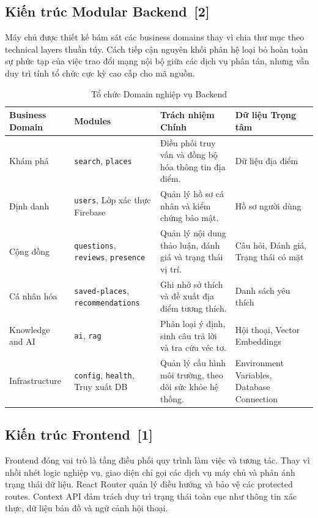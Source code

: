 \documentclass[12pt, a4paper]{article}
\begin{document}
\subsection[Kiến trúc Modular Backend]{Kiến trúc Modular Backend \,{\normalfont\small\textcolor{cyan!70!black}{[2]}}}

Máy chủ được thiết kế bám sát các business domains thay vì chia thư mục theo technical layers thuần túy. Cách tiếp cận nguyên khối phân hệ loại bỏ hoàn toàn sự phức tạp của việc trao đổi mạng nội bộ giữa các dịch vụ phân tán, nhưng vẫn duy trì tính tổ chức cực kỳ cao cấp cho mã nguồn.

\begin{table}[H]
    \centering
    \renewcommand{\arraystretch}{1.3}
    \begin{tabular}{|p{3cm}|p{3.5cm}|p{5cm}|p{3.5cm}|}
    \hline
    \textbf{Business Domain} & \textbf{Modules} & \textbf{Trách nhiệm Chính} & \textbf{Dữ liệu Trọng tâm} \\
    \hline
    Khám phá & \texttt{search}, \texttt{places} & Điều phối truy vấn và đồng bộ hóa thông tin địa điểm. & Dữ liệu địa điểm \\
    \hline
    Định danh & \texttt{users}, Lớp xác thực Firebase & Quản lý hồ sơ cá nhân và kiểm chứng bảo mật. & Hồ sơ người dùng \\
    \hline
    Cộng đồng & \texttt{questions}, \texttt{reviews}, \texttt{presence} & Quản lý nội dung thảo luận, đánh giá và trạng thái vị trí. & Câu hỏi, Đánh giá, Trạng thái có mặt \\
    \hline
    Cá nhân hóa & \texttt{saved-places}, \texttt{recommendations} & Ghi nhớ sở thích và đề xuất địa điểm tương thích. & Danh sách yêu thích \\
    \hline
    Knowledge and AI & \texttt{ai}, \texttt{rag} & Phân loại ý định, sinh câu trả lời và tra cứu véc tơ. & Hội thoại, Vector Embeddings \\
    \hline
    Infrastructure & \texttt{config}, \texttt{health}, Truy xuất DB & Quản lý cấu hình môi trường, theo dõi sức khỏe hệ thống. & Environment Variables, Database Connection \\
    \hline
    \end{tabular}
    \caption{Tổ chức Domain nghiệp vụ Backend}
    \label{tab:backend_modules}
\end{table}

\subsection[Kiến trúc Frontend]{Kiến trúc Frontend \,{\normalfont\small\textcolor{cyan!70!black}{[1]}}}
Frontend đóng vai trò là tầng điều phối quy trình làm việc và tương tác. Thay vì nhồi nhét logic nghiệp vụ, giao diện chỉ gọi các dịch vụ máy chủ và phản ánh trạng thái dữ liệu. React Router quản lý điều hướng và bảo vệ các protected routes. Context API đảm trách duy trì trạng thái toàn cục như thông tin xác thực, dữ liệu bản đồ và ngữ cảnh hội thoại.
\end{document}
